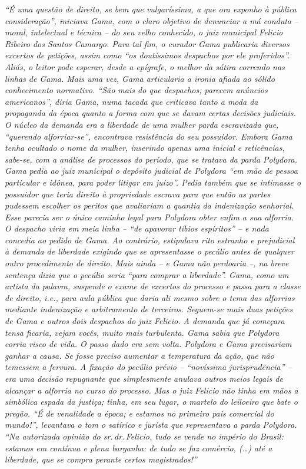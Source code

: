 \begin{didascalia}
\emph{``É uma questão de direito, se bem que vulgaríssima, a que ora
exponho à pública consideração'', iniciava Gama, com o claro objetivo de
denunciar a má conduta -- moral, intelectual e técnica -- do seu velho
conhecido, o juiz municipal Felicio Ribeiro dos Santos Camargo. Para tal
fim, o curador Gama publicaria diversos excertos de petições, assim como
``os doutíssimos despachos por ele proferidos''. Aliás, o leitor pode
esperar, desde a epígrafe, o melhor da sátira correndo nas linhas de
Gama. Mais uma vez, Gama articularia a ironia afiada ao sólido
conhecimento normativo. ``São mais do que despachos; parecem anúncios
americanos'', diria Gama, numa tacada que criticava tanto a moda da
propaganda da época quanto a forma com que se davam certas decisões
judiciais. O núcleo da demanda era a liberdade de uma mulher parda
escravizada que, ``querendo alforriar-se'', encontrava resistência do seu
possuidor. Embora Gama tenha ocultado o nome da mulher, inserindo apenas
uma inicial e reticências, sabe-se, com a análise de processos do
período, que se tratava da parda Polydora. Gama pedia ao juiz municipal
o depósito judicial de Polydora ``em mão de pessoa particular e idônea,
para poder litigar em juízo''. Pedia também que se intimasse o possuidor
que teria direito à propriedade escrava para que então as partes
pudessem escolher os peritos que avaliariam a quantia da indenização
senhorial. Esse parecia ser o único caminho legal para Polydora obter
enfim a sua alforria. O despacho viria em meia linha -- ``de apavorar
tíbios espíritos'' -- e nada concedia ao pedido de Gama. Ao contrário,
estipulava rito estranho e prejudicial à demanda de liberdade exigindo
que se apresentasse o pecúlio antes de qualquer outro procedimento de
direito. Mais ainda -- e Gama não perdoaria --, na breve sentença dizia
que o pecúlio seria ``para comprar a liberdade''. Gama, como um artista da
palavra, suspende o exame de excertos do processo e passa para a classe
de direito, i.e., para aula pública que daria ali mesmo sobre o tema das
alforrias mediante indenização e arbitramento de terceiros. Seguem-se
mais duas petições de Gama e outros dois despachos do juiz Felicio. A
demanda que já começara tensa ficaria, vejam vocês, muito mais
turbulenta. Gama sabia que Polydora corria risco de vida. O passo dado
era sem volta. Polydora e Gama precisariam ganhar a causa. Se fosse
preciso aumentar a temperatura da ação, que não temessem a fervura. A
fixação do pecúlio prévio -- ``novíssima jurisprudência'' -- era uma
decisão repugnante que simplesmente anulava outros meios legais de
alcançar a alforria no curso do processo. Mas o juiz Felicio não tinha
em mãos a simbólica espada da justiça; tinha, em seu lugar, o martelo do
leiloeiro que bate o pregão. ``É de venalidade a época; e estamos no
primeiro país comercial do mundo!'', levantava o tom o satírico e jurista
que representava a parda Polydora. ``Na autorizada opinião do sr.\,dr.\,Felicio, tudo se vende no império do Brasil: estamos em contínua e plena
barganha: de tudo se faz comércio, (\ldots{}) até a liberdade, que se compra
perante certos magistrados!''}
\end{didascalia}

